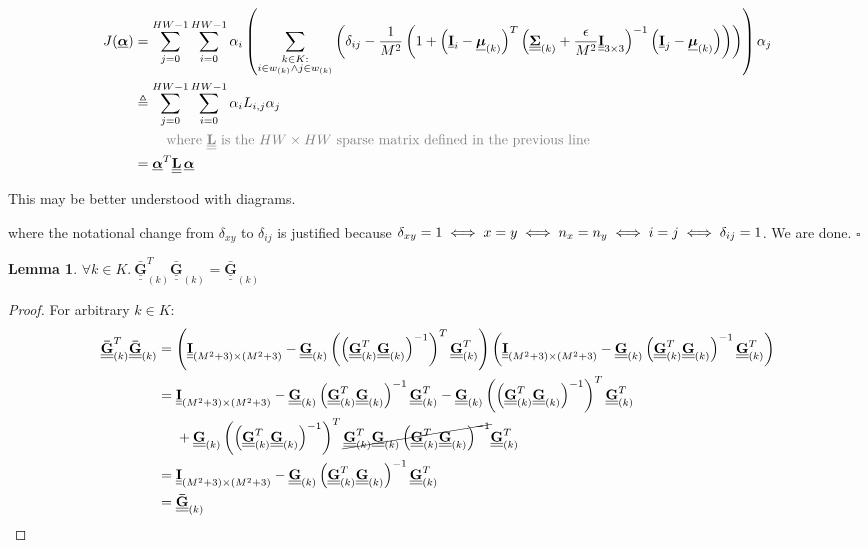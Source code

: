 \documentclass{article}
\theoremstyle{definition}
\newtheorem{lemma}[theorem]{Lemma}
\newcommand{\textgrey}[1]{\textcolor{gray}{#1}}
\def\vt#1{\underline{\mathbf{#1}}}
\def\vts#1{\underline{\boldsymbol{#1}}}
\def\mt#1{\underline{\underline{\mathbf{#1}}}}
\def\mts#1{\underline{\underline{\boldsymbol{#1}}}}
\begin{document}
\begin{align*}
    J(\vts\alpha) &= \sum_{j=0}^{HW-1} \sum_{i=0}^{HW-1} \alpha_i \left(\sum_{\substack{k\in K:\\i\in w_{(k)}\wedge j\in w_{(k)}}} \left( \delta_{ij} - \frac1{M^2}\left(1 + \left(\vt{I}_{i} - \vts \mu_{(k)}\right)^T \left(\mts \Sigma_{(k)} + \frac\epsilon{M^2} \mt{I}_{3\times 3}\right)^{-1} \left(\vt{I}_{j} - \vts \mu_{(k)}\right) \right) \right)\right) \alpha_j\\
    &\triangleq \sum_{j=0}^{HW-1} \sum_{i=0}^{HW-1} \alpha_i L_{i,j} \alpha_j\\
    &\quad\quad\ \textgrey{\text{where $\mt L$ is the $HW\times HW$ sparse matrix defined in the previous line}}\\
    &= \vts \alpha^T \mt L\, \vts \alpha
\end{align*}

This may be better understood with diagrams.


where the notational change from $\delta_{xy}$ to $\delta_{ij}$ is justified because $\delta_{xy} = 1 \iff x=y \iff n_x = n_y \iff i = j\\ \iff \delta_{ij}=1$. We are done. \hfill$\square$


\begin{lemma}\label{lemma1}
    $\forall k \in K.\ \mt{\bar{G}}_{(k)}^T \mt{\bar{G}}_{(k)} = \mt{\bar{G}}_{(k)}$
    \begin{proof}
        For arbitrary $k\in K$:
        \begin{align*}
            \mt{\bar{G}}_{(k)}^T \mt{\bar{G}}_{(k)} &= \left(\mt I_{(M^2+3)\times(M^2+3)} -  \mt G_{(k)} \left(\left(\mt G_{(k)}^T \mt G_{(k)} \right)^{-1}\right)^T \mt G_{(k)}^T \right) \left(\mt I_{(M^2+3)\times(M^2+3)} -  \mt G_{(k)}\left(\mt G_{(k)}^T \mt G_{(k)} \right)^{-1} \mt G_{(k)}^T \right)\\
            &= \mt I_{(M^2+3)\times(M^2+3)} - \mt G_{(k)}\left(\mt G_{(k)}^T \mt G_{(k)} \right)^{-1} \mt G_{(k)}^T - \mt G_{(k)} \left(\left(\mt G_{(k)}^T \mt G_{(k)} \right)^{-1}\right)^T \mt G_{(k)}^T \\
            &\quad\ + \mt G_{(k)} \left(\left(\mt G_{(k)}^T \mt G_{(k)} \right)^{-1}\right)^T \cancel{\mt G_{(k)}^T \mt G_{(k)}\left(\mt G_{(k)}^T \mt G_{(k)} \right)^{-1}} \mt G_{(k)}^T \\
            &= \mt I_{(M^2+3)\times(M^2+3)} - \mt G_{(k)}\left(\mt G_{(k)}^T \mt G_{(k)} \right)^{-1} \mt G_{(k)}^T \\
            &= \mt{\bar{G}}_{(k)}
        \end{align*}
    \end{proof}
\end{lemma}
\end{document}

